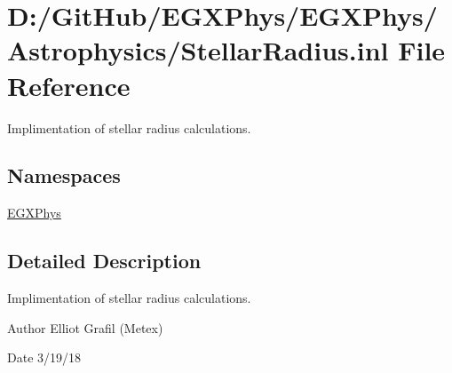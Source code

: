 \hypertarget{_stellar_radius_8inl}{}\section{D\+:/\+Git\+Hub/\+E\+G\+X\+Phys/\+E\+G\+X\+Phys/\+Astrophysics/\+Stellar\+Radius.inl File Reference}
\label{_stellar_radius_8inl}


Implimentation of stellar radius calculations.  


\subsection*{Namespaces}
\begin{DoxyCompactItemize}
\item 
 \mbox{\hyperlink{namespace_e_g_x_phys}{E\+G\+X\+Phys}}
\end{DoxyCompactItemize}


\subsection{Detailed Description}
Implimentation of stellar radius calculations. 

\begin{DoxyAuthor}{Author}
Elliot Grafil (Metex) 
\end{DoxyAuthor}
\begin{DoxyDate}{Date}
3/19/18 
\end{DoxyDate}
